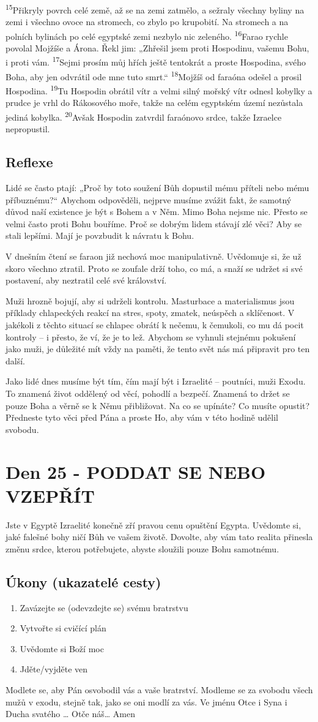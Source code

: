 \documentclass[11pt]{article}
\newcommand{\zacatekCtvrtyTyden}{
  Jste v Egyptě \newline
  Izraelité konečně zří pravou cenu opuštění Egypta. Uvědomte si, jaké falešné bohy ničí Bůh ve vašem životě.
Dovolte, aby vám tato realita přinesla změnu srdce, kterou potřebujete, abyste sloužili pouze Bohu samotnému.

\subsection*{Úkony (ukazatelé cesty)}
\begin{enumerate}
  \item Zavázejte se (odevzdejte se) svému bratrstvu
  \item Vytvořte si cvičící plán
  \item Uvědomte si Boží moc
  \item Jděte/vyjděte ven
\end{enumerate}
Modlete se, aby Pán osvobodil vás a vaše bratrství. \newline
Modleme se za svobodu všech mužů v exodu, stejně tak, jako se oni modlí za vás.\newline
Ve jménu Otce i Syna i Ducha svatého …  Otče náš… Amen
}
\begin{document}
{\textsuperscript{15}Přikryly povrch celé země, až se na zemi zatmělo, a sežraly všechny byliny na zemi i všechno ovoce na stromech, co zbylo po krupobití. Na stromech a na polních bylinách po celé egyptské zemi nezbylo nic zeleného.
\textsuperscript{16}Farao rychle povolal Mojžíše a Árona. Řekl jim: „Zhřešil jsem proti Hospodinu, vašemu Bohu, i proti vám.
\textsuperscript{17}Sejmi prosím můj hřích ještě tentokrát a proste Hospodina, svého Boha, aby jen odvrátil ode mne tuto smrt.“
\textsuperscript{18}Mojžíš od faraóna odešel a prosil Hospodina.
\textsuperscript{19}Tu Hospodin obrátil vítr a velmi silný mořský vítr odnesl kobylky a prudce je vrhl do Rákosového moře, takže na celém egyptském území nezůstala jediná kobylka.
\textsuperscript{20}Avšak Hospodin zatvrdil faraónovo srdce, takže Izraelce nepropustil.
}

\subsection*{Reflexe}

Lidé se často ptají: „Proč by toto soužení Bůh dopustil mému příteli nebo mému příbuznému?“ Abychom odpověděli, nejprve
musíme zvážit fakt, že samotný důvod naší existence je být s Bohem a v Něm. Mimo Boha nejsme nic. Přesto se velmi často
proti Bohu bouříme. Proč se dobrým lidem stávají zlé věci? Aby se stali lepšími. Mají je povzbudit k návratu k Bohu.

V dnešním čtení se faraon již nechová moc manipulativně. Uvědomuje si, že už skoro všechno ztratil. Proto se zoufale drží
toho, co má, a snaží se udržet si své postavení, aby neztratil celé své království.

Muži hrozně bojují, aby si udrželi kontrolu. Masturbace a materialismus jsou příklady chlapeckých reakcí na stres, spoty,
zmatek, neúspěch a sklíčenost. V jakékoli z těchto situací se chlapec obrátí k nečemu, k čemukoli, co mu dá pocit kontroly – i
přesto, že ví, že je to lež. Abychom se vyhnuli stejnému pokušení jako muži, je důležité mít vždy na paměti, že tento svět nás
má připravit pro ten další.

Jako lidé dnes musíme být tím, čím mají být i Izraelité – poutníci, muži Exodu. To znamená život oddělený od věcí, pohodlí a
bezpečí. Znamená to držet se pouze Boha a věrně se k Němu přibližovat. Na co se upínáte? Co musíte opustit? Předneste tyto
věci před Pána a proste Ho, aby vám v této hodině udělil svobodu.


\newpage
\section{Den 25 - PODDAT SE NEBO VZEPŘÍT}
\zacatekCtvrtyTyden
\end{document}
